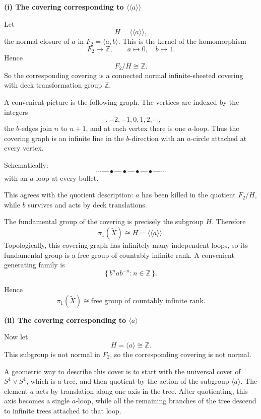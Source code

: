 \begin{solution}

\medskip
\noindent\textbf{(i) The covering corresponding to \texorpdfstring{$\langle\!\langle a\rangle\!\rangle$}{<<a>>}}\par
\smallskip


Let
\[
H=\langle\!\langle a\rangle\!\rangle,
\]
the normal closure of \(a\) in \(F_2=\langle a,b\rangle\). This is the kernel of the homomorphism
\[
F_2\to \mathbb Z,\qquad a\mapsto 0,\quad b\mapsto 1.
\]
Hence
\[
F_2/H\cong \mathbb Z.
\]
So the corresponding covering is a connected normal infinite-sheeted covering with deck transformation group \(\mathbb Z\).

A convenient picture is the following graph. The vertices are indexed by the integers
\[
\cdots,-2,-1,0,1,2,\cdots,
\]
the \(b\)-edges join \(n\) to \(n+1\), and at each vertex there is one \(a\)-loop. Thus the covering graph is an infinite line in the \(b\)-direction with an \(a\)-circle attached at every vertex.

Schematically:
\[
\cdots \text{---} \bullet \text{---} \bullet \text{---} \bullet \text{---} \bullet \text{---} \cdots
\]
with an \(a\)-loop at every bullet.

This agrees with the quotient description: \(a\) has been killed in the quotient \(F_2/H\), while \(b\) survives and acts by deck translations.

The fundamental group of the covering is precisely the subgroup \(H\). Therefore
\[
\pi_1(\widetilde X)\cong H=\langle\!\langle a\rangle\!\rangle.
\]
Topologically, this covering graph has infinitely many independent loops, so its fundamental group is a free group of countably infinite rank. A convenient generating family is
\[
\{\, b^n a b^{-n}: n\in \mathbb Z\,\}.
\]

Hence
\[
\pi_1(\widetilde X)\cong \text{free group of countably infinite rank}.
\]


\medskip
\noindent\textbf{(ii) The covering corresponding to \texorpdfstring{$\langle a\rangle$}{<a>}}\par
\smallskip


Now let
\[
H=\langle a\rangle\cong \mathbb Z.
\]
This subgroup is not normal in \(F_2\), so the corresponding covering is not normal.

A geometric way to describe this cover is to start with the universal cover of \(S^1\vee S^1\), which is a tree, and then quotient by the action of the subgroup \(\langle a\rangle\). The element \(a\) acts by translation along one axis in the tree. After quotienting, this axis becomes a single \(a\)-loop, while all the remaining branches of the tree descend to infinite trees attached to that loop.


\end{solution}

